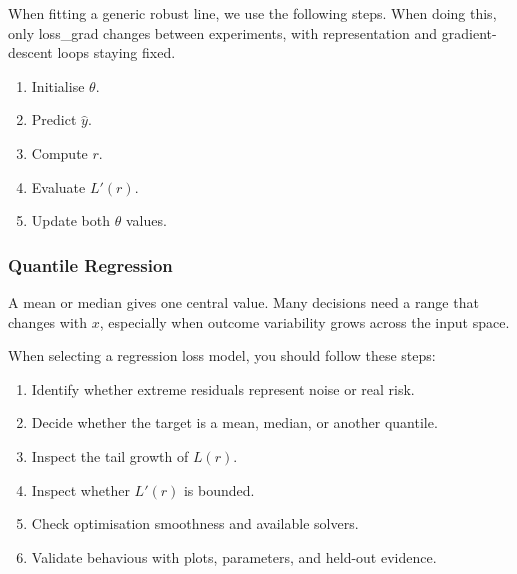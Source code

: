 
When fitting a generic robust line, we use the following steps.
When doing this, only loss\_grad changes between experiments, with representation and gradient-descent loops staying fixed.
\begin{enumerate}
    \item Initialise \(\theta\).
    \item Predict \(\hat{y}\).
    \item Compute \(r\).
    \item Evaluate \(L'(r)\).
    \item Update both \(\theta\) values.
\end{enumerate}

\subsubsection{Quantile Regression}

A mean or median gives one central value.
Many decisions need a range that changes with \(x\), especially when outcome variability grows across the input space.



When selecting a regression loss model, you should follow these steps:
\begin{enumerate}
    \item Identify whether extreme residuals represent noise or real risk.
    \item Decide whether the target is a mean, median, or another quantile.
    \item Inspect the tail growth of \(L(r)\).
    \item Inspect whether \(L'(r)\) is bounded.
    \item Check optimisation smoothness and available solvers.
    \item Validate behavious with plots, parameters, and held-out evidence.
\end{enumerate}

